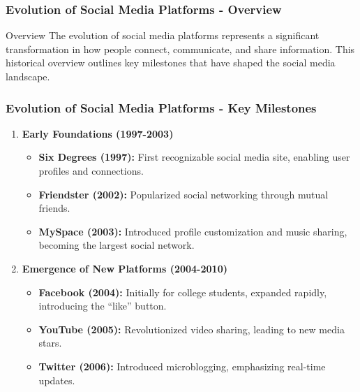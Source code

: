 \documentclass{beamer}
\begin{document}
\begin{frame}[fragile]
    \frametitle{Evolution of Social Media Platforms - Overview}
    \begin{block}{Overview}
        The evolution of social media platforms represents a significant transformation in how people connect, communicate, and share information. This historical overview outlines key milestones that have shaped the social media landscape.
    \end{block}
\end{frame}

\begin{frame}[fragile]
    \frametitle{Evolution of Social Media Platforms - Key Milestones}
    \begin{enumerate}
        \item \textbf{Early Foundations (1997-2003)}
            \begin{itemize}
                \item \textbf{Six Degrees (1997):} First recognizable social media site, enabling user profiles and connections.
                \item \textbf{Friendster (2002):} Popularized social networking through mutual friends.
                \item \textbf{MySpace (2003):} Introduced profile customization and music sharing, becoming the largest social network.
            \end{itemize}
        \item \textbf{Emergence of New Platforms (2004-2010)}
            \begin{itemize}
                \item \textbf{Facebook (2004):} Initially for college students, expanded rapidly, introducing the “like” button.
                \item \textbf{YouTube (2005):} Revolutionized video sharing, leading to new media stars.
                \item \textbf{Twitter (2006):} Introduced microblogging, emphasizing real-time updates.
            \end{itemize}
    \end{enumerate}
\end{frame}
\end{document}
